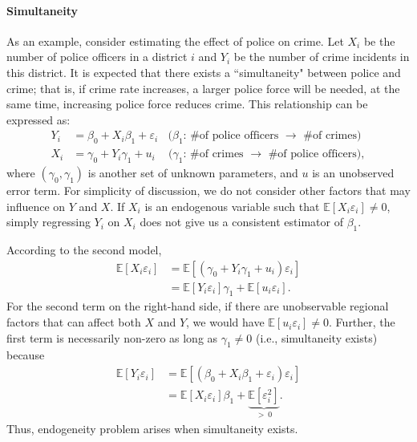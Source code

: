 \documentclass[10.5pt, A4paper, openany, uplatex]{book}
\newcommand{\eps}{\varepsilon}
\newcommand{\E}{\mathbb{E}}
\numberwithin{equation}{section}
\begin{document}
\paragraph{Simultaneity}
As an example, consider estimating the effect of police on crime.
Let $X_i$ be the number of police officers in a district $i$ and $Y_i$ be the number of crime incidents in this district. 
It is expected that there exists a ``simultaneity" between police and crime; that is, if crime rate increases, a larger police force will be needed, at the same time, increasing police force reduces crime.
This relationship can be expressed as: 
\begin{align*}
Y_i  &  =\beta_0 + X_i \beta_1 + \eps_i \;\; \text{ ($\beta_1$: \# of  police officers $\rightarrow$ \# of crimes)} \\
X_i  &  =\gamma_0 + Y_i\gamma_1 + u_i \;\;\; \text{ ($\gamma_1$: \# of crimes $\rightarrow$ \# of police officers)},
\end{align*}
where $(\gamma_0, \gamma_1)$ is another set of unknown parameters, and $u$ is an unobserved error term.
For simplicity of discussion, we do not consider other factors that may influence on $Y$ and $X$.
If $X_i$ is an endogenous variable such that $\E[  X_i \eps_i ]  \neq 0$, simply regressing $Y_i$ on $X_i$ does not give us a consistent estimator of $\beta_1$.

According to the second model,
\begin{align*}
	\E[ X_i \eps_i ] 
	& = \E[(\gamma_0 + Y_i \gamma_1 + u_i) \eps_i ] \\
	& = \E[  Y_i \eps_i ]  \gamma_1 + \E[u_i \eps_i].
\end{align*}
For the second term on the right-hand side, if there are unobservable regional factors that can affect both $X$ and $Y$, we would have $\E[u_i \eps_i] \neq 0$.
Further, the first term is necessarily non-zero as long as $\gamma_1 \neq 0$ (i.e., simultaneity exists) because
\begin{align*}
	\E[  Y_i \eps_i ]
	& = \E[(\beta_0 + X_i \beta_1 + \eps_i) \eps_i ] \\
	& = \E[  X_i \eps_i ]  \beta_1 + \underbrace{\E[\eps^2_i]}_{ > \: 0}.
\end{align*}
Thus, endogeneity problem arises when simultaneity exists.
\end{document}
